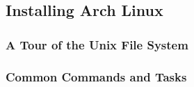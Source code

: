 



\subsection{Installing Arch Linux}

\subsubsection{A Tour of the Unix File System}





\subsubsection{Common Commands and Tasks}



